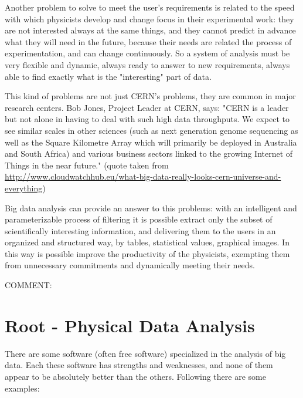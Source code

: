 Another problem to solve to meet the user's requirements is related to the speed with which physicists develop and change focus in their experimental work: they are not interested always at the same things, and they cannot predict in advance what they will need in the future, because their needs are related the process of experimentation, and can change continuously. 
So a system of analysis must be very flexible and dynamic, always ready to answer to new requirements, always able to find exactly what is the "interesting" part of data.  

This kind of problems are not just CERN's problems, they are common in major research centers. Bob Jones, Project Leader at CERN, says:
"CERN is a leader but not alone in having to deal with such high data throughputs. We expect to see similar scales in other sciences (such as next generation genome sequencing as well as the Square Kilometre Array which will primarily be deployed in Australia and South Africa) and various business sectors linked to the growing Internet of Things in the near future."
(quote taken from \url{http://www.cloudwatchhub.eu/what-big-data-really-looks-cern-universe-and-everything})
 
Big data analysis can provide an answer to this problems: with an intelligent and parameterizable process of filtering it is possible extract only the subset of scientifically interesting information, and delivering them to the users in an organized and structured way, by tables, statistical values, graphical images. 
In this way is possible improve the productivity of the physicists, exempting them from unnecessary commitments and dynamically meeting their needs. 

COMMENT: %

\section{Root - Physical Data Analysis }

There are some software (often free software) specialized in the analysis of big data. Each these software has strengths and weaknesses, and none of them appear to be absolutely better than the others. Following there are some examples:
 
